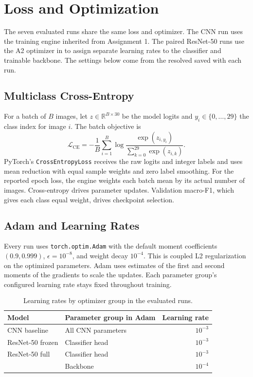 \clearpage
\section{Loss and Optimization}
\label{sec:loss-and-optimization}

The seven evaluated runs share the same loss and optimizer. The CNN run uses the training engine inherited from Assignment 1. The paired ResNet-50 runs use the A2 optimizer in  to assign separate learning rates to the classifier and trainable backbone. The settings below come from the resolved  saved with each run.

\subsection{Multiclass Cross-Entropy}

For a batch of $B$ images, let $z\in\mathbb{R}^{B\times30}$ be the model logits and $y_i\in\{0,\ldots,29\}$ the class index for image $i$. The batch objective is
\begin{equation}
    \mathcal{L}_{\mathrm{CE}}
    = -\frac{1}{B}\sum_{i=1}^{B}
    \log\frac{\exp(z_{i,y_i})}{\sum_{k=0}^{29}\exp(z_{i,k})}.
    \label{eq:a2-cross-entropy}
\end{equation}
PyTorch's \texttt{CrossEntropyLoss} receives the raw logits and integer labels and uses mean reduction with equal sample weights and zero label smoothing. For the reported epoch loss, the engine weights each batch mean by its actual number of images. Cross-entropy drives parameter updates. Validation macro-F1, which gives each class equal weight, drives checkpoint selection.

\subsection{Adam and Learning Rates}

Every run uses \texttt{torch.optim.Adam} with the default moment coefficients $(0.9,0.999)$, $\epsilon=10^{-8}$, and weight decay $10^{-4}$. This is coupled L2 regularization on the optimized parameters. Adam uses estimates of the first and second moments of the gradients to scale the updates. Each parameter group's configured learning rate stays fixed throughout training.

\begin{table}[H]
    \centering
    \caption{Learning rates by optimizer group in the evaluated runs.}
    \label{tab:a2-learning-rates}
    \begin{tabular}{llr}
        \toprule
        Model & Parameter group in Adam & Learning rate \\
        \midrule
        CNN baseline & All CNN parameters & $10^{-3}$ \\
        ResNet-50 frozen & Classifier head & $10^{-3}$ \\
        ResNet-50 full & Classifier head & $10^{-3}$ \\
                       & Backbone & $10^{-4}$ \\
        \bottomrule
    \end{tabular}
\end{table}

